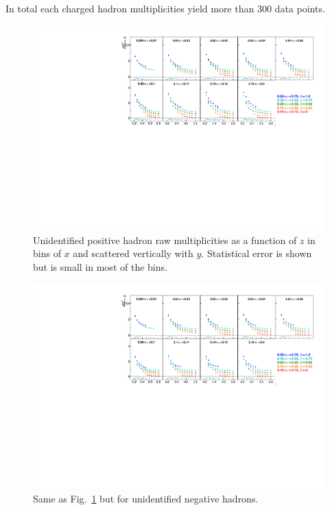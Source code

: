 In total each charged hadron multiplicities yield more than $300$ data points.

\begin{figure}[!h]
	\includegraphics[scale=0.85]{./gfx/rawhp.pdf}
	\caption{Unidentified positive hadron raw multiplicities as a function of $z$ in bins of $x$ and scattered vertically with $y$. Statistical error is shown but is small in most of the bins.}
	\label{pic:rawhp}
\end{figure}

\newpage

\begin{figure}[!h]
  \includegraphics[scale=0.85]{./gfx/rawhm.pdf}
  \caption{Same as Fig.~\ref{pic:rawhp} but for unidentified negative hadrons.}
  \label{pic:rawhm}
\end{figure}

